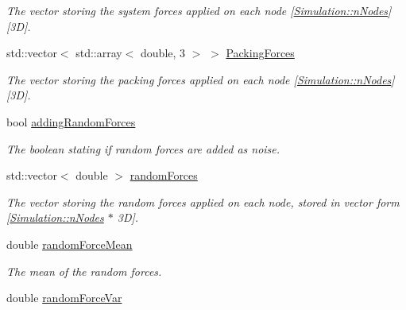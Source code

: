 \begin{DoxyCompactItemize}
\begin{DoxyCompactList}\small\item\em The vector storing the system forces applied on each node \mbox{[}\hyperlink{classSimulation_ab779ac291bc517de8a598ab72094c1a6}{Simulation\+::n\+Nodes}\mbox{]}\mbox{[}3\+D\mbox{]}. \end{DoxyCompactList}\item 
\hypertarget{classSimulation_a999a884533442902aa3a868f4c326a1c}{}std\+::vector$<$ std\+::array$<$ double, 3 $>$ $>$ \hyperlink{classSimulation_a999a884533442902aa3a868f4c326a1c}{Packing\+Forces}\label{classSimulation_a999a884533442902aa3a868f4c326a1c}

\begin{DoxyCompactList}\small\item\em The vector storing the packing forces applied on each node \mbox{[}\hyperlink{classSimulation_ab779ac291bc517de8a598ab72094c1a6}{Simulation\+::n\+Nodes}\mbox{]}\mbox{[}3\+D\mbox{]}. \end{DoxyCompactList}\item 
\hypertarget{classSimulation_af8c661769aba37b7374be811dc230e01}{}bool \hyperlink{classSimulation_af8c661769aba37b7374be811dc230e01}{adding\+Random\+Forces}\label{classSimulation_af8c661769aba37b7374be811dc230e01}

\begin{DoxyCompactList}\small\item\em The boolean stating if random forces are added as noise. \end{DoxyCompactList}\item 
\hypertarget{classSimulation_a08bbe7a4f6a277158fac630b4336e3e2}{}std\+::vector$<$ double $>$ \hyperlink{classSimulation_a08bbe7a4f6a277158fac630b4336e3e2}{random\+Forces}\label{classSimulation_a08bbe7a4f6a277158fac630b4336e3e2}

\begin{DoxyCompactList}\small\item\em The vector storing the random forces applied on each node, stored in vector form \mbox{[}\hyperlink{classSimulation_ab779ac291bc517de8a598ab72094c1a6}{Simulation\+::n\+Nodes} $\ast$ 3\+D\mbox{]}. \end{DoxyCompactList}\item 
\hypertarget{classSimulation_a56b272cd63a24f903ab2378d71330e48}{}double \hyperlink{classSimulation_a56b272cd63a24f903ab2378d71330e48}{random\+Force\+Mean}\label{classSimulation_a56b272cd63a24f903ab2378d71330e48}

\begin{DoxyCompactList}\small\item\em The mean of the random forces. \end{DoxyCompactList}\item 
\hypertarget{classSimulation_aa16edf4b6fbdfb5cbc953ecefb21620c}{}double \hyperlink{classSimulation_aa16edf4b6fbdfb5cbc953ecefb21620c}{random\+Force\+Var}\label{classSimulation_aa16edf4b6fbdfb5cbc953ecefb21620c}


\end{DoxyCompactItemize}
